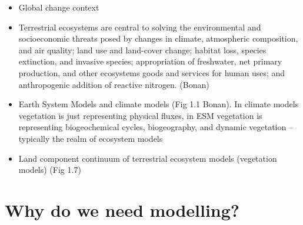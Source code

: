 \documentclass[oneside]{book}
\providecommand{\tightlist}{%
  \setlength{\itemsep}{0pt}\setlength{\parskip}{0pt}}
\begin{document}
\begin{itemize}
\tightlist
\item
  Global change context
\item
  Terrestrial ecosystems are central to solving the environmental and
  socioeconomic threats posed by changes in climate, atmospheric
  composition, and air quality; land use and land-cover change; habitat
  loss, species extinction, and invasive species; appropriation of
  freshwater, net primary production, and other ecosystems goods and
  services for human uses; and anthropogenic addition of reactive
  nitrogen. (Bonan)
\item
  Earth System Models and climate models (Fig 1.1 Bonan). In climate
  models vegetation is just representing physical fluxes, in ESM
  vegetation is representing biogeochemical cycles, biogeography, and
  dynamic vegetation -- typically the realm of ecosystem models
\item
  Land component continuum of terrestrial ecosystem models (vegetation
  models) (Fig 1.7)
\end{itemize}

\section{Why do we need modelling?}\label{why-do-we-need-modelling}
\end{document}
